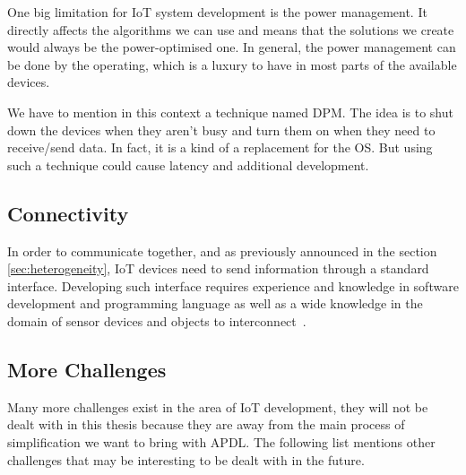 One big limitation for \gls{IoT} system development is the power management. It
directly affects the algorithms we can use and means that the solutions we
create would always be the power-optimised one\cite{Sneps-Sneppe2016}. In
general, the power management can be done by the operating, which is a luxury
to have in most parts of the available devices.

We have to mention in this context a technique named \gls{DPM}. The idea is to
shut down the devices when they aren't busy and turn them on when they
need to receive/send data. In fact, it is a kind of a replacement for the
\gls{OS}. But using such a technique could cause latency and additional development.

\subsection{Connectivity}
\label{sec:connectivity}

In order to communicate together, and as previously announced in the section
\ref{sec:heterogeneity}, \gls{IoT} devices need to send information through
a standard interface. Developing such interface requires experience and knowledge
in software development and programming language as well as a wide knowledge in
the domain of sensor devices and objects to interconnect~\cite{midgar}.

\subsection{More Challenges}
\label{sec:more_challenges}

Many more challenges exist in the area of \gls{IoT} development, they will not
be dealt with
in this thesis because they are away from the main process
of simplification we want to bring with \gls{APDL}. The following list mentions
other challenges that may be interesting to be dealt with in the future. 

